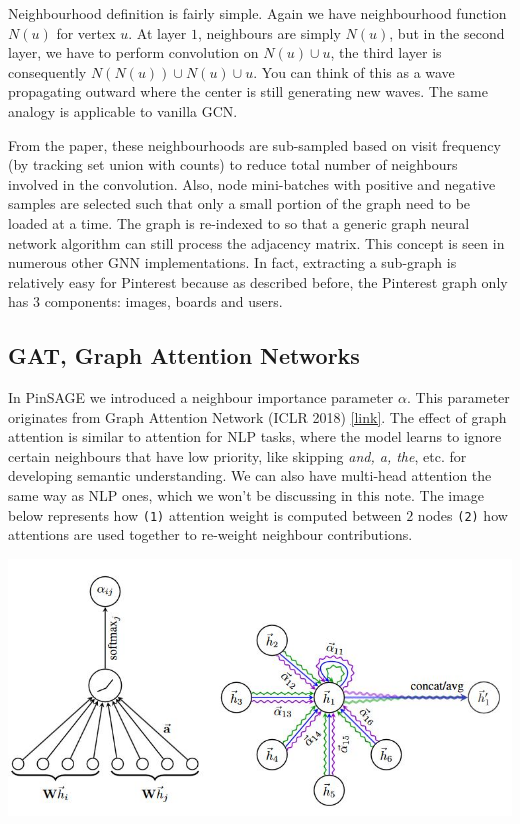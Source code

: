 Neighbourhood definition is fairly simple. Again we have neighbourhood function $N(u)$ for vertex $u$. At layer $1$, neighbours are simply $N(u)$, but in the second layer, we have to perform convolution on $N(u) \cup u$, the third layer is consequently $N(N(u)) \cup N(u) \cup u$. You can think of this as a wave propagating outward where the center is still generating new waves. The same analogy is applicable to vanilla GCN.

From the paper, these neighbourhoods are sub-sampled based on visit frequency (by tracking set union with counts) to reduce total number of neighbours involved in the convolution. Also, node mini-batches with positive and negative samples are selected such that only a small portion of the graph need to be loaded at a time. The graph is re-indexed to so that a generic graph neural network algorithm can still process the adjacency matrix. This concept is seen in numerous other GNN implementations. In fact, extracting a sub-graph is relatively easy for Pinterest because as described before, the Pinterest graph only has $3$ components: images, boards and users.

\subsection{GAT, Graph Attention Networks} \label{ss_56_gat}

In PinSAGE we introduced a neighbour importance parameter $\alpha$. This parameter originates from Graph Attention Network (ICLR 2018) \href{https://arxiv.org/pdf/1710.10903.pdf}{[link]}. The effect of graph attention is similar to attention for NLP tasks, where the model learns to ignore certain neighbours that have low priority, like skipping \textit{and, a, the}, etc. for developing semantic understanding. We can also have multi-head attention the same way as NLP ones, which we won't be discussing in this note. The image below represents how \texttt{(1)} attention weight is computed between $2$ nodes \texttt{(2)} how attentions are used together to re-weight neighbour contributions.

{
\centering
\includegraphics[width=0.75\linewidth]{notes/img/n5_gat.JPG} \par
}

